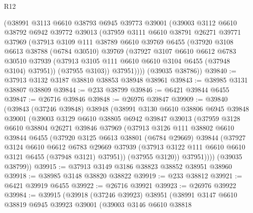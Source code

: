 \begin{lexlean}{R12}
\begin{coremodule}
      (@38991
        @3113
        @6610
        @38793
        @6945
        @39773
        @39001
        (@39003
          @3112
          @6610
          @38792
          @6942
          @39772
          @39013
          (@37959
            @3111
            @6610
            @38791
            @26271
            @39771
            @37969
            (@37913
              @3109
              @111
              @38789
              @6610
              @39769
              @6455
              (@37920
                @3108
                @6613
                @38788
                (@6784 @30510)
                @39769
                (@37927
                  @3107
                  @6610
                  @6612
                  @6783
                  @30510
                  @37939
                  (@37913 @3105 @111 @6610 @6610 @3104 @6455 (@37948 @3104) @37951))
                (@37955 @3103))
              @37951))))
      (@39035 @38786))
@39840 := @37913 @3132 @3187 @38810 @38853 @38948 @38961
@39843 := @38985 @3131 @38807 @38809
@39844 := @233 @38799
@39846 := @6421 @39844 @6455
@39847 := @26716 @39846
@39848 := @26976 @39847
@39909 := @39840
    (@39843
      (@37246 @39848)
      @38948
      (@38991
        @3130
        @6610
        @38806
        @6945
        @39848
        @39001
        (@39003
          @3129
          @6610
          @38805
          @6942
          @39847
          @39013
          (@37959
            @3128
            @6610
            @38804
            @26271
            @39846
            @37969
            (@37913
              @3126
              @111
              @38802
              @6610
              @39844
              @6455
              (@37920
                @3125
                @6613
                @38801
                (@6784 @29669)
                @39844
                (@37927
                  @3124
                  @6610
                  @6612
                  @6783
                  @29669
                  @37939
                  (@37913 @3122 @111 @6610 @6610 @3121 @6455 (@37948 @3121) @37951))
                (@37955 @3120))
              @37951))))
      (@39035 @38799))
@39915 := @37913 @3149 @3186 @38823 @38852 @38951 @38960
@39918 := @38985 @3148 @38820 @38822
@39919 := @233 @38812
@39921 := @6421 @39919 @6455
@39922 := @26716 @39921
@39923 := @26976 @39922
@39984 := @39915
    (@39918
      (@37246 @39923)
      @38951
      (@38991
        @3147
        @6610
        @38819
        @6945
        @39923
        @39001
        (@39003
          @3146
          @6610
          @38818

\end{coremodule}
\end{lexlean}
